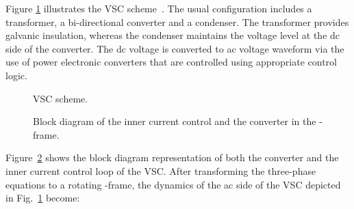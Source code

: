 \documentclass[journal, a4paper]{IEEEtran}
\begin{document}
Figure \ref{vsc} illustrates the VSC 
scheme~\cite{Chauduri:14, belmans:14, chauduri:11}.
The usual configuration includes a transformer, a bi-directional
converter and a condenser.  The transformer provides galvanic
insulation, whereas the condenser maintains the voltage level at the
dc side of the converter.  The dc voltage is converted to ac voltage
waveform via the use of power electronic converters that are controlled 
using appropriate control logic.
\begin{figure}[t!]
  \begin{center}
    \psfrag{+}{\footnotesize{}}
    \psfrag{-}{\footnotesize{}}
    \caption{VSC scheme.}
    \label{vsc}
  \end{center}
  \vspace{-0.2cm}
\end{figure}
\begin{figure}[t!]
  \begin{center}
    \psfrag{+}{\footnotesize{}}
    \psfrag{-}{\footnotesize{}}
    \caption{Block diagram of the inner current control and the converter in the -frame.}
    \label{vsccoupling}
  \end{center}
  \vspace{-0.4cm}
\end{figure}

Figure~\ref{vsccoupling} shows the block diagram representation of both the converter
and the inner current control loop of the VSC. 
After transforming the three-phase equations to a rotating -frame, 
the dynamics of the ac side of the VSC depicted in Fig.~\ref{vsc} become:
\end{document}
